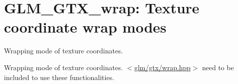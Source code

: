 \hypertarget{group__gtx__wrap}{\section{\-G\-L\-M\-\_\-\-G\-T\-X\-\_\-wrap\-: \-Texture coordinate wrap modes}
\label{group__gtx__wrap}
}


\-Wrapping mode of texture coordinates.  


\-Wrapping mode of texture coordinates. $<$\hyperlink{wrap_8hpp}{glm/gtx/wrap.\-hpp}$>$ need to be included to use these functionalities. 